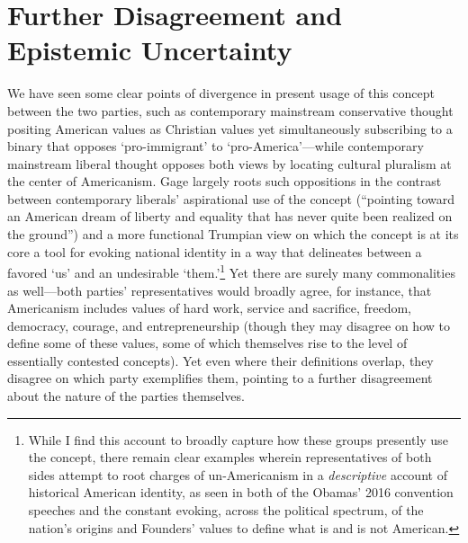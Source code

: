 \section{Further Disagreement and Epistemic
Uncertainty}\label{further-disagreement-and-epistemic-uncertainty}

We have seen some clear points of divergence in present usage of this
concept between the two parties, such as contemporary mainstream
conservative thought positing American values as Christian values yet
simultaneously subscribing to a binary that opposes `pro-immigrant' to
`pro-America'---while contemporary mainstream liberal thought opposes
both views by locating cultural pluralism at the center of Americanism.
Gage largely roots such oppositions in the contrast between contemporary
liberals' aspirational use of the concept (``pointing toward an American
dream of liberty and equality that has never quite been realized on the
ground'') and a more functional Trumpian view on which the concept is at
its core a tool for evoking national identity in a way that delineates
between a favored `us' and an undesirable `them.'\footnote{While I find
  this account to broadly capture how these groups presently use the
  concept, there remain clear examples wherein representatives of both
  sides attempt to root charges of un-Americanism in a
  \emph{descriptive} account of historical American identity, as seen in
  both of the Obamas' 2016 convention speeches and the constant evoking,
  across the political spectrum, of the nation's origins and Founders'
  values to define what is and is not American.} Yet there are surely
many commonalities as well---both parties' representatives would broadly
agree, for instance, that Americanism includes values of hard work,
service and sacrifice, freedom, democracy, courage, and entrepreneurship
(though they may disagree on how to define some of these values, some of
which themselves rise to the level of essentially contested concepts).
Yet even where their definitions overlap, they disagree on which party
exemplifies them, pointing to a further disagreement about the nature of
the parties themselves.

